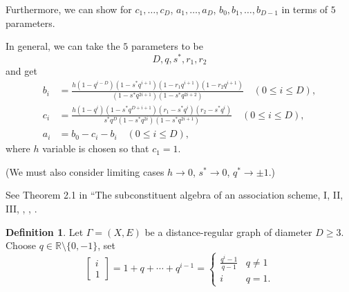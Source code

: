 \documentclass[
]{book}
\theoremstyle{definition}
\newtheorem{definition}{Definition}[chapter]
\theoremstyle{definition}
\theoremstyle{definition}
\theoremstyle{definition}
\theoremstyle{remark}
\begin{document}
Furthermore, we can show for \(c_1, \ldots, c_D\), \(a_1, \ldots, a_D\), \(b_0, b_1, \ldots, b_{D-1}\) in terms of \(5\) parameters.

In general, we can take the \(5\) parameters to be
\[D, q, s^*, r_1, r_2\]
and get
\begin{align}
b_i & = \frac{h(1-q^{i-D})(1-s^*q^{i+1})(1-r_1q^{i+1})(1-r_2q^{i+1})}{(1-s^*q^{2i+1})(1-s^*q^{2i+2})} \quad (0\leq i\leq D),\\
c_i & = \frac{h(1-q^{i})(1-s^*q^{D+i+1})(r_1-s^*q^{i})(r_2-s^*q^{i})}{s^*q^D(1-s^*q^{2i})(1-s^*q^{2i+1})} \quad (0\leq i\leq D),\\
a_i & = b_0 - c_i - b_i \quad (0\leq i\leq D),
\end{align}
where \(h\) variable is chosen so that \(c_1 = 1\).

(We must also consider limiting cases \(h\to 0\), \(s^*\to 0\), \(q^*\to \pm 1\).)

See Theorem 2.1 in ``The subconstituent algebra of an association scheme, I, II, III, \citep{terwilliger:1992}, \citep{terwilliger:1993-1}, \citep{terwilliger:1993-2}.

\begin{definition}
\protect\hypertarget{def:qbinomial}{}\label{def:qbinomial}Let \(\Gamma = (X,E)\) be a distance-regular graph of diameter \(D\geq 3\). Choose \(q \in \mathbb{R}\setminus \{0,-1\}\), set
\[\begin{bmatrix}{i}\\{1}\end{bmatrix} = 1 + q + \cdots + q^{i-1} = \begin{cases} \frac{q^i-1}{q-1} & q\neq 1\\
i & q = 1.\end{cases}\]
\end{definition}
\end{document}

